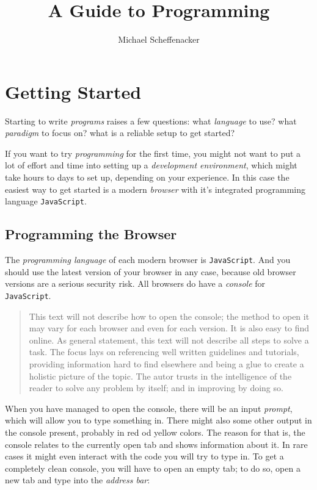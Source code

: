 \documentclass[a4paper,10pt]{scrbook}
\title{A Guide to Programming}
\author{Michael Scheffenacker}
\begin{document}
\maketitle

\chapter{Getting Started}

Starting to write \emph{programs} raises a few questions: what \emph{language} to use? what \emph{paradigm} to focus on? what is a reliable setup to get started?

If you want to try \emph{programming} for the first time, you might not want to put a lot of effort and time into setting up a \emph{development environment}, which might take hours to days to set up, depending on your experience.
In this case the easiest way to get started is a modern \emph{browser} with it's integrated programming language \texttt{JavaScript}.

\section{Programming the Browser}

The \emph{programming language} of each modern browser is \texttt{JavaScript}.
And you should use the latest version of your browser in any case, because old browser versions are a serious security risk.
All browsers do have a \emph{console} for \texttt{JavaScript}.

\begin{quotation}
 This text will not describe how to open the console;
 the method to open it may vary for each browser and even for each version.
 It is also easy to find online.
 As general statement, this text will not describe all steps to solve a task.
 The focus lays on referencing well written guidelines and tutorials, providing information hard to find elsewhere and being a glue to create a holistic picture of the topic.
 The autor trusts in the intelligence of the reader to solve any problem by itself;
 and in improving by doing so.
\end{quotation}

When you have managed to open the console, there will be an input \emph{prompt}, which will allow you to type something in. There might also some other output in the console present, probably in red od yellow colors.
The reason for that is, the console relates to the currently open tab and shows information about it.
In rare cases it might even interact with the code you will try to type in.
To get a completely clean console, you will have to open an empty tab;
to do so, open a new tab and type into the \emph{address bar}:
\end{document}
